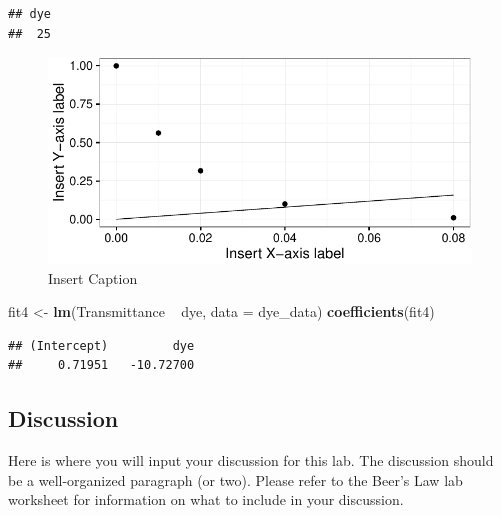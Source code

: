 \documentclass[]{article}
\newenvironment{Shaded}{\begin{snugshade}}{\end{snugshade}}
\newcommand{\KeywordTok}[1]{\textcolor[rgb]{0.13,0.29,0.53}{\textbf{{#1}}}}
\newcommand{\DataTypeTok}[1]{\textcolor[rgb]{0.13,0.29,0.53}{{#1}}}
\newcommand{\StringTok}[1]{\textcolor[rgb]{0.31,0.60,0.02}{{#1}}}
\newcommand{\NormalTok}[1]{{#1}}
\begin{document}
\begin{verbatim}
## dye 
##  25
\end{verbatim}

\begin{figure}[htbp]
\centering
\includegraphics{Beers_Law_files/figure-latex/unnamed-chunk-4-1.pdf}
\caption{Insert Caption}
\end{figure}

\begin{Shaded}
\begin{Highlighting}[]
\NormalTok{fit4 <-}\StringTok{ }\KeywordTok{lm}\NormalTok{(Transmittance ~}\StringTok{ }\NormalTok{dye, }\DataTypeTok{data =} \NormalTok{dye_data)}
\KeywordTok{coefficients}\NormalTok{(fit4)}
\end{Highlighting}
\end{Shaded}

\begin{verbatim}
## (Intercept)         dye 
##     0.71951   -10.72700
\end{verbatim}

\subsection{Discussion}\label{discussion}

Here is where you will input your discussion for this lab. The
discussion should be a well-organized paragraph (or two). Please refer
to the Beer's Law lab worksheet for information on what to include in
your discussion.
\end{document}
